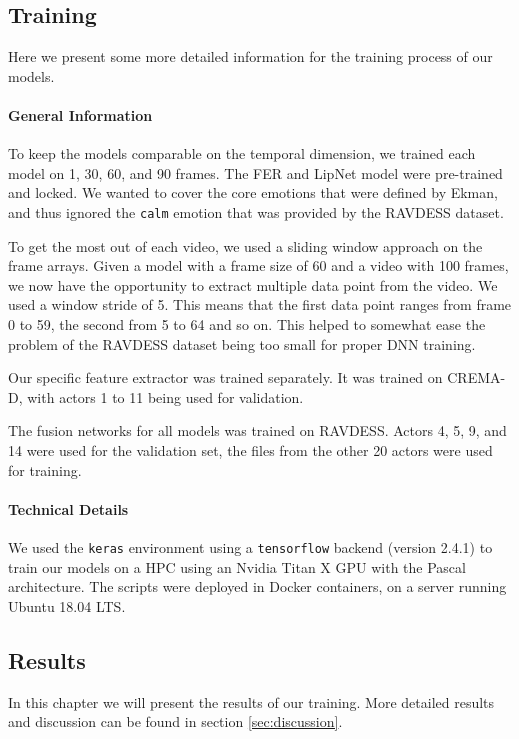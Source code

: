 \subsection{Training}
Here we present some more detailed information for the training process of our models.
\paragraph{General Information}
To keep the models comparable on the temporal dimension, we trained each model on 1, 30, 60, and 90 frames. The FER and LipNet model were pre-trained and locked. We wanted to cover the core emotions that were defined by Ekman, and thus ignored the \texttt{calm} emotion that was provided by the RAVDESS dataset.

To get the most out of each video, we used a sliding window approach on the frame arrays. Given a model with a frame size of 60 and a video with 100 frames, we now have the opportunity to extract multiple data point from the video. We used a window stride of 5. This means that the first data point ranges from frame 0 to 59, the second from 5 to 64 and so on. This helped to somewhat ease the problem of the RAVDESS dataset being too small for proper DNN training. 

Our specific feature extractor was trained separately. It was trained on CREMA-D, with actors 1 to 11 being used for validation.

The fusion networks for all models was trained on RAVDESS. Actors 4, 5, 9, and 14 were used for the validation set, the files from the other 20 actors were used for training.

\paragraph{Technical Details}
We used the \texttt{keras} environment using a \texttt{tensorflow} backend (version 2.4.1) to train our models on a HPC using an Nvidia Titan X GPU with the Pascal architecture. The scripts were deployed in Docker containers, on a server running Ubuntu 18.04 LTS.

\subsection{Results}
In this chapter we will present the results of our training. More detailed results and discussion can be found in section \ref{sec:discussion}.
